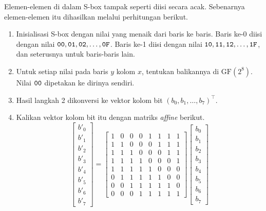 Elemen-elemen di dalam S-box tampak seperti diisi secara acak. Sebenarnya
elemen-elemen itu dihasilkan melalui perhitungan berikut.
\begin{enumerate}
    \item Inisialisasi S-box dengan nilai yang menaik dari baris ke baris. Baris
    ke-0 diisi dengan nilai $\texttt{00}, \texttt{01}, \texttt{02}, \dots, \texttt{0F}$.
    Baris ke-1 diisi dengan nilai $\texttt{10}, \texttt{11}, \texttt{12}, \dots,
    \texttt{1F}$, dan seterusnya untuk baris-baris lain.
    \item Untuk setiap nilai pada baris $y$ kolom $x$, tentukan balikannya di
    $\text{GF}(2^8)$. Nilai $\texttt{00}$ dipetakan ke dirinya sendiri.
    \item Hasil langkah 2 dikonversi ke vektor kolom bit
    $(b_0, b_1, \dots, b_7)^{\top}$.
    \item Kalikan vektor kolom bit itu dengan matriks \textit{affine} berikut.
    \begin{equation}
    \begin{bmatrix} b'_0 \\ b'_1 \\ b'_2 \\ b'_3 \\ b'_4 \\ b'_5 \\ b'_6 \\ b'_7 \end{bmatrix}
    =
    \begin{bmatrix}
    1 & 0 & 0 & 0 & 1 & 1 & 1 & 1 \\
    1 & 1 & 0 & 0 & 0 & 1 & 1 & 1 \\
    1 & 1 & 1 & 0 & 0 & 0 & 1 & 1 \\
    1 & 1 & 1 & 1 & 0 & 0 & 0 & 1 \\
    1 & 1 & 1 & 1 & 1 & 0 & 0 & 0 \\
    0 & 1 & 1 & 1 & 1 & 1 & 0 & 0 \\
    0 & 0 & 1 & 1 & 1 & 1 & 1 & 0 \\
    0 & 0 & 0 & 1 & 1 & 1 & 1 & 1
    \end{bmatrix}
    \begin{bmatrix} b_0 \\ b_1 \\ b_2 \\ b_3 \\ b_4 \\ b_5 \\ b_6 \\ b_7 \end{bmatrix}

\end{equation}
\end{enumerate}
